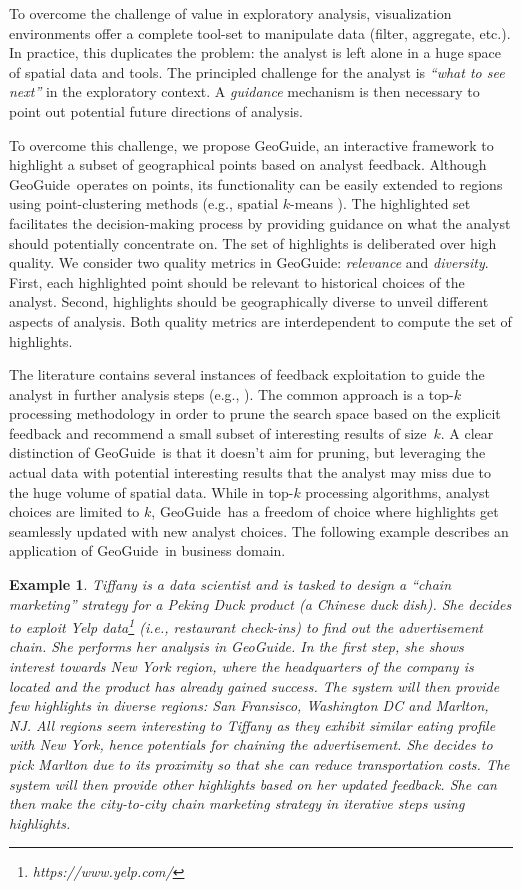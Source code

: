 \documentclass[conference,compsoc]{IEEEtran}
\newtheorem{example}{Example}
\newcommand{\framework}{{\sc GeoGuide}}
\begin{document}
To overcome the challenge of value in exploratory analysis, visualization environments offer a complete tool-set to manipulate data (filter, aggregate, etc.). In practice, this duplicates the problem: the analyst is left alone in a huge space of spatial data and tools. The principled challenge for the analyst is {\em ``what to see next''} in the exploratory context. A {\em guidance} mechanism is then necessary to point out potential future directions of analysis.

To overcome this challenge, we  propose \framework, an interactive framework to highlight a subset of geographical points based on analyst feedback. Although \framework\ operates on points, its functionality can be easily extended to regions using point-clustering methods (e.g., spatial $k$-means \cite{sharma2012k}). The highlighted set facilitates the decision-making process by providing guidance on what the analyst should potentially concentrate on. The set of highlights is deliberated over high quality. We consider two quality metrics in \framework: {\em relevance} and {\em diversity}. First, each highlighted point should be relevant to historical choices of the analyst. Second, highlights should be geographically diverse to unveil different aspects of analysis. Both quality metrics are interdependent to compute the set of highlights.

The literature contains several instances of feedback exploitation to guide the analyst in further analysis steps (e.g., \cite{boley2013one}). The common approach is a top-$k$ processing methodology in order to prune the search space based on the explicit feedback and recommend a small subset of interesting results of size~$k$. A clear distinction of \framework\ is that it doesn't aim for pruning, but leveraging the actual data with potential interesting results that the analyst may miss due to the huge volume of spatial data. While in top-$k$ processing algorithms, analyst choices are limited to $k$, \framework\ has a freedom of choice where highlights get seamlessly updated with new analyst choices. The following example describes an application of \framework\ in business domain.

\begin{example}
\label{ex:flight}
Tiffany is a data scientist and is tasked to design a ``chain marketing'' strategy for a Peking Duck product (a Chinese duck dish). She decides to exploit Yelp data\footnote{\it https://www.yelp.com/} (i.e., restaurant check-ins) to find out the advertisement chain. She performs her analysis in \framework. In the first step, she shows interest towards New York region, where the headquarters of the company is located and the product has already gained success. The system will then provide few highlights in diverse regions: San Fransisco, Washington DC and Marlton, NJ. All regions seem interesting to Tiffany as they exhibit similar eating profile with New York, hence potentials for chaining the advertisement. She decides to pick Marlton due to its proximity so that she can reduce transportation costs. The system will then provide other highlights based on her updated feedback. She can then make the city-to-city chain marketing strategy in iterative steps using highlights.
\end{example}
\end{document}
